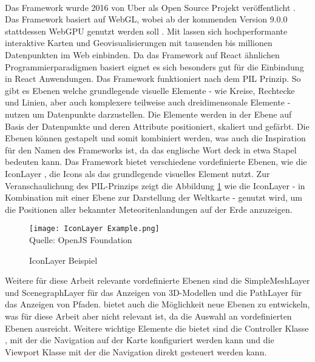 \paragraph{\deckgl{}}
Das Framework \deckgl{} wurde 2016 von Uber als Open Source Projekt veröffentlicht \cite{Visgl}. Das Framework basiert auf \ac{WebGL}, wobei ab der kommenden Version 9.0.0 stattdessen WebGPU genutzt werden soll \cite{Green2022}. Mit \deckgl{} lassen sich hochperformante interaktive Karten und Geovisualisierungen mit tausenden bis millionen Datenpunkten im Web einbinden. Da das Framework auf React ähnlichen Programmierparadigmen basiert eignet es sich besonders gut für die Einbindung in React Anwendungen. Das Framework funktioniert nach dem \ac{PIL} Prinzip. So gibt es Ebenen welche grundlegende visuelle Elemente - wie Kreise, Rechtecke und Linien, aber auch komplexere teilweise auch dreidimensonale Elemente - nutzen um Datenpunkte darzustellen. Die Elemente werden in der Ebene auf Basis der Datenpunkte und deren Attribute positioniert, skaliert und gefärbt. Die Ebenen können gestapelt und somit kombiniert werden, was auch die Inspiration für den Namen des Frameworks ist, da das englische Wort deck in etwa Stapel bedeuten kann.\cite[S.~2]{YangWang2019} Das Framework bietet verschiedene vordefinierte Ebenen, wie die IconLayer \cite{DeckglIconLayer}, die Icons als das grundlegende visuelles Element nutzt. Zur Veranschaulichung des \ac{PIL}-Prinzips zeigt die Abbildung \ref{fig:IconLayerExample} wie die IconLayer - in Kombination mit einer Ebene zur Darstellung der Weltkarte - genutzt wird, um die Positionen aller bekannter Meteoritenlandungen auf der Erde anzuzeigen.

\begin{figure}[H]
    \caption{IconLayer Beispiel}\label{fig:IconLayerExample}
    \texttt{[image: IconLayer Example.png]}
    \\
    Quelle: OpenJS Foundation \cite{DeckGlMeteorites}
\end{figure}

Weitere für diese Arbeit relevante vordefinierte Ebenen sind die SimpleMeshLayer \cite{DeckglSimpleMeshLayer} und ScenegraphLayer \cite{DeckglScenegraphLayer} für das Anzeigen von 3D-Modellen und die PathLayer für das Anzeigen von Pfaden. \deckgl{} bietet auch die Möglichkeit neue Ebenen zu entwickeln, was für diese Arbeit aber nicht relevant ist, da die Auswahl an vordefinierten Ebenen ausreicht. Weitere wichtige Elemente die \deckgl{} bietet sind die Controller Klasse \cite{DeckglController}, mit der die Navigation auf der Karte konfiguriert werden kann und die Viewport Klasse \cite{DeckglViewport} mit der die Navigation direkt gesteuert werden kann.

